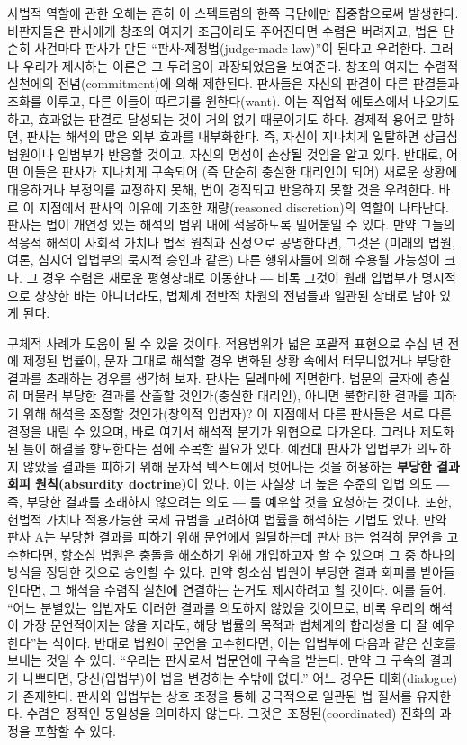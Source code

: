 \documentclass[12pt,a4paper]{article}
\begin{document}
사법적 역할에 관한 오해는 흔히 이 스펙트럼의 한쪽 극단에만 집중함으로써
발생한다. 비판자들은 판사에게 창조의 여지가 조금이라도 주어진다면 수렴은
버려지고, 법은 단순히 사건마다 판사가 만든 ``판사-제정법(judge-made
law)''이 된다고 우려한다. 그러나 우리가 제시하는 이론은 그 두려움이
과장되었음을 보여준다. 창조의 여지는 수렴적 실천에의 전념(commitment)에
의해 제한된다. 판사들은 자신의 판결이 다른 판결들과 조화를 이루고, 다른
이들이 따르기를 \textsf{원한다(want)}. 이는 직업적 에토스에서 나오기도
하고, 효과없는 판결로 달성되는 것이 거의 없기 때문이기도 하다. 경제적
용어로 말하면, 판사는 해석의 많은 외부 효과를 내부화한다. 즉, 자신이
지나치게 일탈하면 상급심 법원이나 입법부가 반응할 것이고, 자신의 명성이
손상될 것임을 알고 있다. 반대로, 어떤 이들은 판사가 지나치게 구속되어
(즉 단순히 충실한 대리인이 되어) 새로운 상황에 대응하거나 부정의를
교정하지 못해, 법이 경직되고 반응하지 못할 것을 우려한다. 바로 이
지점에서 판사의 이유에 기초한 재량(reasoned discretion)의 역할이
나타난다. 판사는 법이 개연성 있는 해석의 범위 내에 적응하도록 밀어붙일
수 있다. 만약 그들의 적응적 해석이 사회적 가치나 법적 원칙과 진정으로
공명한다면, 그것은 (미래의 법원, 여론, 심지어 입법부의 묵시적 승인과
같은) \textsf{다른 행위자들에 의해 수용될} 가능성이 크다. 그 경우 수렴은
새로운 평형상태로 이동한다 ― 비록 그것이 원래 입법부가 명시적으로 상상한
바는 아니더라도, 법체계 전반적 차원의 전념들과 일관된 상태로 남아 있게
된다.

구체적 사례가 도움이 될 수 있을 것이다. 적용범위가 넓은 포괄적 표현으로
수십 년 전에 제정된 법률이, 문자 그대로 해석할 경우 변화된 상황 속에서
터무니없거나 부당한 결과를 초래하는 경우를 생각해 보자. 판사는 딜레마에
직면한다. 법문의 글자에 충실히 머물러 부당한 결과를 산출할 것인가(충실한
대리인), 아니면 불합리한 결과를 피하기 위해 해석을 조정할 것인가(창의적
입법자)? 이 지점에서 다른 판사들은 서로 다른 결정을 내릴 수 있으며, 바로
여기서 해석적 분기가 위협으로 다가온다. 그러나 제도화된 틀이 해결을
향도한다는 점에 주목할 필요가 있다. 예컨대 판사가 입법부가 의도하지
않았을 결과를 피하기 위해 문자적 텍스트에서 벗어나는 것을 허용하는
\textbf{부당한 결과 회피 원칙(absurdity doctrine)}이 있다. 이는 사실상
더 높은 수준의 입법 의도 ― 즉, 부당한 결과를 초래하지 않으려는 의도 ― 를
예우할 것을 요청하는 것이다. 또한, 헌법적 가치나 적용가능한 국제 규범을
고려하여 법률을 해석하는 기법도 있다. 만약 판사 A는 부당한 결과를 피하기
위해 문언에서 일탈하는데 판사 B는 엄격히 문언을 고수한다면, 항소심
법원은 충돌을 해소하기 위해 개입하고자 할 수 있으며 그 중 하나의 방식을
정당한 것으로 승인할 수 있다. 만약 항소심 법원이 부당한 결과 회피를
받아들인다면, 그 해석을 수렴적 실천에 연결하는 논거도 제시하려고 할
것이다. 예를 들어, ``어느 분별있는 입법자도 이러한 결과를 의도하지
않았을 것이므로, 비록 우리의 해석이 가장 문언적이지는 않을 지라도, 해당
법률의 목적과 법체계의 합리성을 더 잘 예우한다''는 식이다. 반대로 법원이
문언을 고수한다면, 이는 입법부에 다음과 같은 신호를 보내는 것일 수 있다.
``우리는 판사로서 법문언에 구속을 받는다. 만약 그 구속의 결과가
나쁘다면, 당신(입법부)이 법을 변경하는 수밖에 없다.'' 어느 경우든
대화(dialogue)가 존재한다. 판사와 입법부는 상호 조정을 통해 궁극적으로
일관된 법 질서를 유지한다. 수렴은 정적인 동일성을 의미하지 않는다.
그것은 조정된(coordinated) 진화의 과정을 포함할 수 있다.
\end{document}

